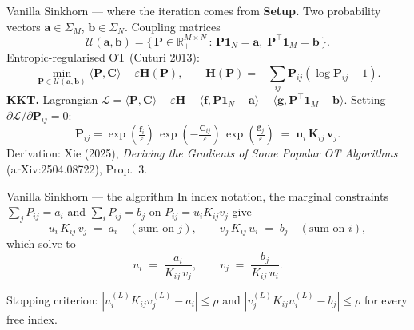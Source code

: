 \documentclass[10pt,aspectratio=169]{beamer}
\newcommand{\R}{\mathbb{R}}
\begin{document}
\begin{frame}{Vanilla Sinkhorn --- where the iteration comes from}
  \textbf{Setup.} Two probability vectors $\mathbf{a} \in \Sigma_M$, $\mathbf{b} \in \Sigma_N$. Coupling matrices
  \[
    \mathcal{U}(\mathbf{a}, \mathbf{b}) = \{\,\mathbf{P} \in \R^{M\times N}_{+} \,:\, \mathbf{P}\mathbf{1}_N = \mathbf{a},\; \mathbf{P}^\top \mathbf{1}_M = \mathbf{b}\,\}.
  \]
  Entropic-regularised OT (Cuturi 2013):
  \[
    \min_{\mathbf{P} \in \mathcal{U}(\mathbf{a}, \mathbf{b})} \langle \mathbf{P}, \mathbf{C}\rangle - \varepsilon \mathbf{H}(\mathbf{P}),
    \qquad \mathbf{H}(\mathbf{P}) = -\!\sum_{ij} \mathbf{P}_{ij}(\log \mathbf{P}_{ij} - 1).
  \]
  \textbf{KKT.} Lagrangian $\mathcal{L} = \langle \mathbf{P}, \mathbf{C}\rangle - \varepsilon \mathbf{H} - \langle \mathbf{f}, \mathbf{P}\mathbf{1}_N - \mathbf{a}\rangle - \langle \mathbf{g}, \mathbf{P}^\top \mathbf{1}_M - \mathbf{b}\rangle$. Setting $\partial \mathcal{L}/\partial \mathbf{P}_{ij} = 0$:
  \[
    \mathbf{P}_{ij} = \exp\!\left(\tfrac{\mathbf{f}_i}{\varepsilon}\right)\,\exp\!\left(-\tfrac{\mathbf{C}_{ij}}{\varepsilon}\right)\,\exp\!\left(\tfrac{\mathbf{g}_j}{\varepsilon}\right)
    \;=\; \mathbf{u}_i\, \mathbf{K}_{ij}\, \mathbf{v}_j.
  \]
  \footnotesize Derivation: Xie (2025), \emph{Deriving the Gradients of Some Popular OT Algorithms} (arXiv:2504.08722), Prop.\ 3.
\end{frame}

\begin{frame}{Vanilla Sinkhorn --- the algorithm}
  In index notation, the marginal constraints
  $\sum_j P_{ij} = a_i$ and $\sum_i P_{ij} = b_j$ on $P_{ij} = u_i K_{ij} v_j$ give
  \[
    u_i\, K_{ij}\, v_j \;=\; a_i \quad (\text{sum on } j), \qquad
    v_j\, K_{ij}\, u_i \;=\; b_j \quad (\text{sum on } i),
  \]
  which solve to
  \[
    u_i \;=\; \frac{a_i}{K_{ij}\, v_j}, \qquad v_j \;=\; \frac{b_j}{K_{ij}\, u_i}.
  \]

  \medskip
  \begin{center}
  \end{center}

  \medskip
  Stopping criterion: $|u_i^{(L)} K_{ij} v_j^{(L)} - a_i| \le \rho$ and $|v_j^{(L)} K_{ij} u_i^{(L)} - b_j| \le \rho$ for every free index.
\end{frame}
\end{document}
